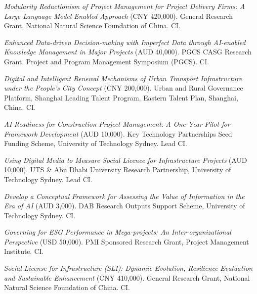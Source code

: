\documentclass[11pt,a4paper]{report} %
\begin{document}
    \begin{tablist}

        \item[2027--30] \tab{}\textit{Modularity Reductionism of Project Management for Project Delivery Firms: A Large Language Model Enabled Approach} (CNY 420,000). General Research Grant, National Natural Science Foundation of China. CI.
        
        \item[2026--27] \tab{}\textit{Enhanced Data-driven Decision-making with Imperfect Data through AI-enabled Knowledge Management in Major Projects} (AUD 40,000). PGCS CASG Research Grant. Project and Program Management Symposium (PGCS). CI.

        \item[2025--27] \tab{}\textit{Digital and Intelligent Renewal Mechanisms of Urban Transport Infrastructure under the People's City Concept} (CNY 200,000). Urban and Rural Governance Platform, Shanghai Leading Talent Program, Eastern Talent Plan, Shanghai, China. CI.

        \item[2025--26] \tab{}\textit{AI Readiness for Construction Project Management: A One-Year Pilot for Framework Development} (AUD 10,000). Key Technology Partnerships Seed Funding Scheme, University of Technology Sydney. Lead CI.
        
        \item[2024--25] \tab{}\textit{Using Digital Media to Measure Social Licence for Infrastructure Projects} (AUD 10,000). UTS \& Abu Dhabi University Research Partnership, University of Technology Sydney. Lead CI.
        
        \item[2024] \tab{}\textit{Develop a Conceptual Framework for Assessing the Value of Information in the Era of AI} (AUD 3,000). DAB Research Outputs Support Scheme, University of Technology Sydney. CI.
        
        \item[2024--25] \tab{}\textit{Governing for ESG Performance in Mega-projects: An Inter-organizational Perspective} (USD 50,000). PMI Sponsored Research Grant, Project Management Institute. CI.
        
        \item[2024--27] \tab{}\textit{Social License for Infrastructure (SLI): Dynamic Evolution, Resilience Evaluation and Sustainable Enhancement} (CNY 410,000). General Research Grant, National Natural Science Foundation of China. CI.
        

\end{tablist}
\end{document}
